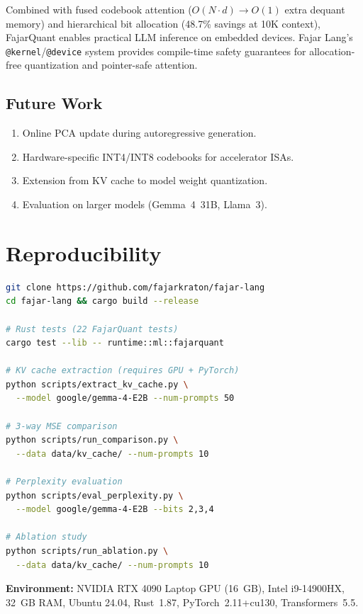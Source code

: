 \documentclass[10pt,twocolumn]{article}
\begin{document}
Combined with fused codebook attention ($O(N \cdot d) \to O(1)$ extra dequant memory) and hierarchical bit allocation (48.7\% savings at 10K context), FajarQuant enables practical LLM inference on embedded devices. Fajar Lang's \texttt{@kernel}/\texttt{@device} system provides compile-time safety guarantees for allocation-free quantization and pointer-safe attention.

\subsection*{Future Work}
\begin{enumerate}[nosep]
\item Online PCA update during autoregressive generation.
\item Hardware-specific INT4/INT8 codebooks for accelerator ISAs.
\item Extension from KV cache to model weight quantization.
\item Evaluation on larger models (Gemma~4~31B, Llama~3).
\end{enumerate}

\appendix

\section{Reproducibility}

\begin{lstlisting}[language=bash,caption={Reproducing all results}]
git clone https://github.com/fajarkraton/fajar-lang
cd fajar-lang && cargo build --release

# Rust tests (22 FajarQuant tests)
cargo test --lib -- runtime::ml::fajarquant

# KV cache extraction (requires GPU + PyTorch)
python scripts/extract_kv_cache.py \
  --model google/gemma-4-E2B --num-prompts 50

# 3-way MSE comparison
python scripts/run_comparison.py \
  --data data/kv_cache/ --num-prompts 10

# Perplexity evaluation
python scripts/eval_perplexity.py \
  --model google/gemma-4-E2B --bits 2,3,4

# Ablation study
python scripts/run_ablation.py \
  --data data/kv_cache/ --num-prompts 10
\end{lstlisting}

\textbf{Environment:} NVIDIA RTX 4090 Laptop GPU (16~GB), Intel i9-14900HX, 32~GB RAM, Ubuntu 24.04, Rust~1.87, PyTorch~2.11+cu130, Transformers~5.5.
\end{document}
